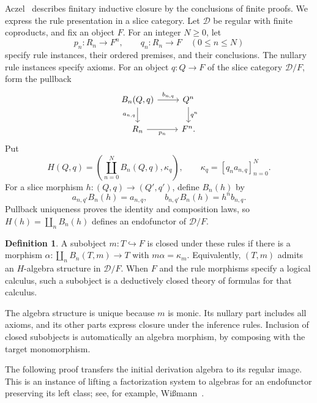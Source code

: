 \documentclass[11pt]{article}
\theoremstyle{definition}\newtheorem{definition}[theorem]{Definition}
\begin{document}
Aczel~\cite[Propositions 1.1.4 and 1.4.5]{Aczel} describes finitary
inductive closure by the conclusions of finite proofs. We express the
rule presentation in a slice category.
Let $\mathcal D$ be regular with finite coproducts, and fix an object
$F$. For an integer $N\geq0$, let
\[
 p_n:R_n\longrightarrow F^n,\qquad
 q_n:R_n\longrightarrow F\quad(0\leq n\leq N)
\]
specify rule instances, their ordered premises, and their conclusions.
The nullary rule instances specify axioms.
For an object $q:Q\to F$ of the slice category $\mathcal D/F$,
form the pullback
\[
\begin{tikzcd}
 B_n(Q,q)\arrow[r,"{b_{n,q}}"]\arrow[d,"{a_{n,q}}"'] &
 Q^n\arrow[d,"q^n"]\\
 R_n\arrow[r,"p_n"'] & F^n.
\end{tikzcd}
\]
Put
\[
 H(Q,q)=\left(\coprod_{n=0}^N B_n(Q,q),\kappa_q\right),\qquad
 \kappa_q=[q_na_{n,q}]_{n=0}^N.
\]
For a slice morphism $h:(Q,q)\to(Q',q')$, define $B_n(h)$ by
\[
 a_{n,q'}B_n(h)=a_{n,q},\qquad
 b_{n,q'}B_n(h)=h^n b_{n,q}.
\]
Pullback uniqueness proves the identity and composition laws, so
$H(h)=\coprod_nB_n(h)$ defines an endofunctor of $\mathcal D/F$.

\begin{definition}\label{def:deductively-closed}
A subobject $m:T\hookrightarrow F$ is closed under these rules if
there is a morphism $\alpha:\coprod_nB_n(T,m)\to T$ with
$m\alpha=\kappa_m$. Equivalently, $(T,m)$ admits an $H$-algebra
structure in $\mathcal D/F$. When $F$ and the rule morphisms specify
a logical calculus, such a subobject is a deductively closed theory
of formulas for that calculus.
\end{definition}

The algebra structure is unique because $m$ is monic. Its nullary
part includes all axioms, and its other parts express closure under
the inference rules. Inclusion of closed subobjects is automatically
an algebra morphism, by composing with the target monomorphism.

The following proof transfers the initial derivation algebra to its
regular image. This is an instance of lifting a factorization system to
algebras for an endofunctor preserving its left class; see, for example,
Wi\ss{}mann~\cite[Lemma 3.6]{Wissmann}.
\end{document}

